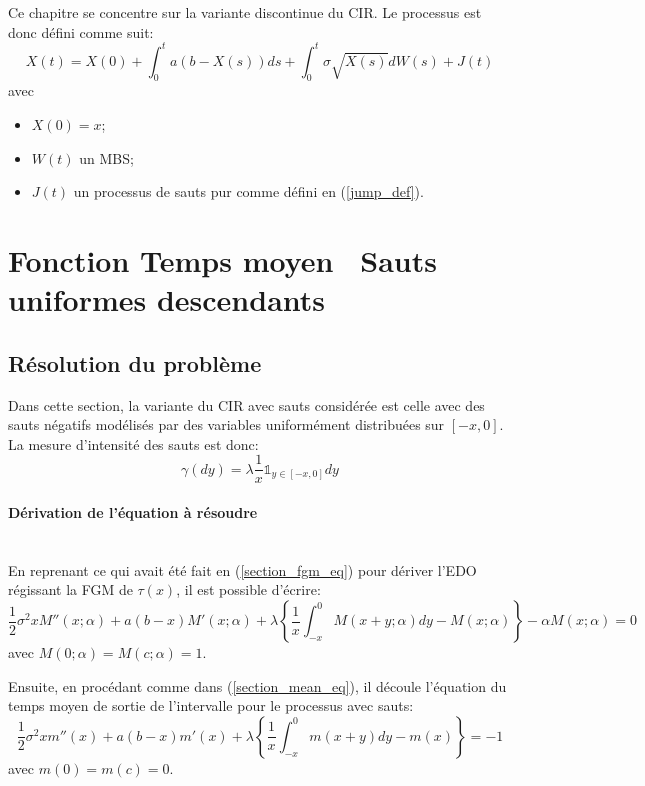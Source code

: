 \label{sec:FPT_Jump}
Ce chapitre se concentre sur la variante discontinue du \acs{CIR}. Le processus est donc défini comme suit:
\begin{equation}\label{jump_cir_sde}
    X(t)=X(0)+\int_0^t a(b-X(s))ds+\int_0^t\sigma\sqrt{X(s)}dW(s)+J(t)
\end{equation}
avec
\begin{itemize}
    \item $X(0)=x$;
    \item $W(t)$ un \acs{MBS};
    \item $J(t)$ un processus de sauts pur comme défini en (\ref{jump_def}).
\end{itemize}

\section{Fonction Temps moyen \textemdash~Sauts uniformes descendants}\label{subsection_mean_jumps}
\subsection{Résolution du problème}
Dans cette section, la variante du \ac{CIR} avec sauts considérée est celle avec des sauts négatifs modélisés par des variables uniformément distribuées sur $[-x,0]$. La mesure d'intensité des sauts est donc:
\[
\gamma(dy)=\lambda\frac{1}{x}\mathds{1}_{y\in[-x,0]}dy
\]

\paragraph{Dérivation de l'équation à résoudre}\phantom{}\\
En reprenant ce qui avait été fait en (\ref{section_fgm_eq}) pour dériver l'\acs{EDO} régissant la \acl{FGM} de $\tau(x)$, il est possible d'écrire:
\[
\frac{1}{2}\sigma^2 xM''(x;\alpha)+a(b-x)M'(x;\alpha)+\lambda\left\{\frac{1}{x}\int_{-x}^0M(x+y;\alpha)dy-M(x;\alpha)\right\}-\alpha M(x;\alpha)=0
\]
avec $M(0;\alpha)=M(c;\alpha)=1$.

Ensuite, en procédant comme dans (\ref{section_mean_eq}), il découle l'équation du temps moyen de sortie de l'intervalle pour le processus avec sauts:
\begin{equation}\label{mean_ide}
    \frac{1}{2}\sigma^2 xm''(x)+a(b-x)m'(x)+\lambda\left\{\frac{1}{x}\int_{-x}^0m(x+y)dy-m(x)\right\}=-1
\end{equation}
avec $m(0)=m(c)=0$.

